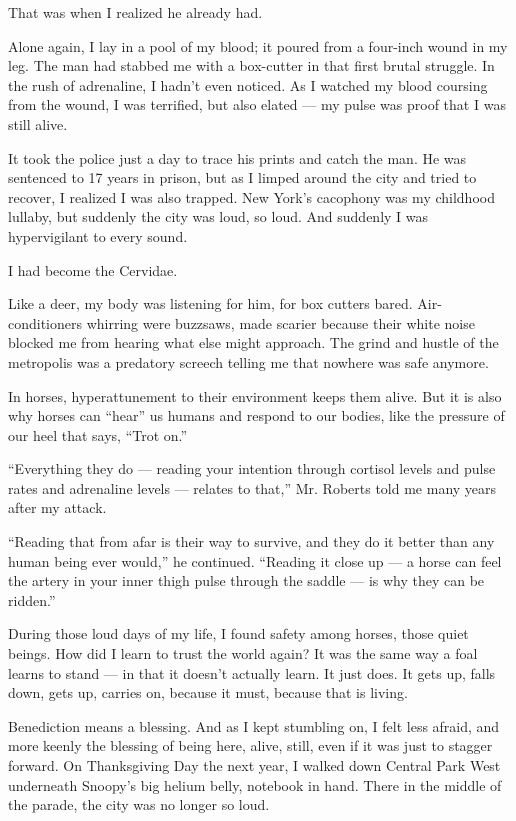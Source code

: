 That was when I realized he already had.

Alone again, I lay in a pool of my blood; it poured from a four-inch
wound in my leg. The man had stabbed me with a box-cutter in that first
brutal struggle. In the rush of adrenaline, I hadn't even noticed. As I
watched my blood coursing from the wound, I was terrified, but also
elated --- my pulse was proof that I was still alive.

It took the police just a day to trace his prints and catch the man. He
was sentenced to 17 years in prison, but as I limped around the city and
tried to recover, I realized I was also trapped. New York's cacophony
was my childhood lullaby, but suddenly the city was loud, so loud. And
suddenly I was hypervigilant to every sound.

I had become the Cervidae.

Like a deer, my body was listening for him, for box cutters bared.
Air-conditioners whirring were buzzsaws, made scarier because their
white noise blocked me from hearing what else might approach. The grind
and hustle of the metropolis was a predatory screech telling me that
nowhere was safe anymore.

In horses, hyperattunement to their environment keeps them alive. But it
is also why horses can ``hear'' us humans and respond to our bodies,
like the pressure of our heel that says, ``Trot on.''

``Everything they do --- reading your intention through cortisol levels
and pulse rates and adrenaline levels --- relates to that,'' Mr. Roberts
told me many years after my attack.

``Reading that from afar is their way to survive, and they do it better
than any human being ever would,'' he continued. ``Reading it close up
--- a horse can feel the artery in your inner thigh pulse through the
saddle --- is why they can be ridden.''

During those loud days of my life, I found safety among horses, those
quiet beings. How did I learn to trust the world again? It was the same
way a foal learns to stand --- in that it doesn't actually learn. It
just does. It gets up, falls down, gets up, carries on, because it must,
because that is living.

Benediction means a blessing. And as I kept stumbling on, I felt less
afraid, and more keenly the blessing of being here, alive, still, even
if it was just to stagger forward. On Thanksgiving Day the next year, I
walked down Central Park West underneath Snoopy's big helium belly,
notebook in hand. There in the middle of the parade, the city was no
longer so loud.

